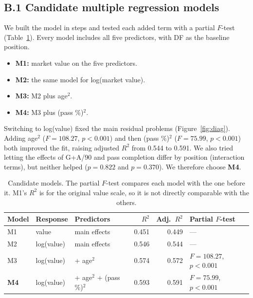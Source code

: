 \documentclass[11pt]{article}
\begin{document}
\subsection*{B.1 Candidate multiple regression models}
We built the model in steps and tested each added term with a partial $F$-test (Table~\ref{tab:models}). Every model includes all five predictors, with DF as the baseline position.
\begin{itemize}
    \item \textbf{M1:} market value on the five predictors.
    \item \textbf{M2:} the same model for log(market value).
    \item \textbf{M3:} M2 plus age$^2$.
    \item \textbf{M4:} M3 plus (pass \%)$^2$.
\end{itemize}
Switching to log(value) fixed the main residual problems (Figure~\ref{fig:diag}). Adding age$^2$ ($F = 108.27$, $p < 0.001$) and then (pass \%)$^2$ ($F = 75.99$, $p < 0.001$) both improved the fit, raising adjusted $R^2$ from 0.544 to 0.591. We also tried letting the effects of G+A/90 and pass completion differ by position (interaction terms), but neither helped ($p = 0.822$ and $p = 0.370$). We therefore choose \textbf{M4}.

\begin{table}[!htb]
    \centering
    \caption{Candidate models. The partial $F$-test compares each model with the one before it. M1's $R^2$ is for the original value scale, so it is not directly comparable with the others.}
    \label{tab:models}
    \small
    \begin{tabular}{lllrrl}
        \toprule
        Model       & Response   & Predictors                & $R^2$ & Adj.\ $R^2$ & Partial $F$-test          \\
        \midrule
        M1          & value      & main effects              & 0.451 & 0.449       & ---                       \\
        M2          & log(value) & main effects              & 0.546 & 0.544       & ---                       \\
        M3          & log(value) & + age$^2$                 & 0.574 & 0.572       & $F = 108.27$, $p < 0.001$ \\
        \textbf{M4} & log(value) & + age$^2$ + (pass \%)$^2$ & 0.593 & 0.591       & $F = 75.99$, $p < 0.001$  \\
        \bottomrule
    \end{tabular}
\end{table}
\end{document}

